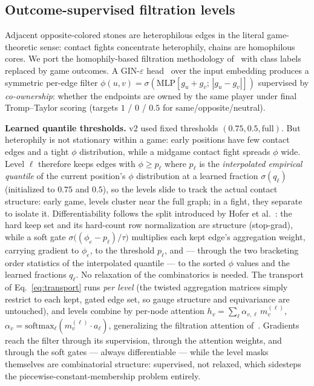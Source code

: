 \documentclass[11pt]{article}
\newcommand{\eps}{\varepsilon}
\begin{document}
\subsection{Outcome-supervised filtration levels}
\label{sec:filtration}
Adjacent opposite-colored stones are heterophilous edges in the literal
game-theoretic sense: contact fights concentrate heterophily, chains are
homophilous cores. We port the homophily-based filtration methodology
of~\cite{leventhal2025filtration} with class labels replaced by game
outcomes. A GIN-$\eps$ head~\cite{xu2019gin,hofer2020} over the input
embedding produces a symmetric per-edge filter
$\phi(u,v)=\sigma(\mathrm{MLP}[g_u{+}g_v;\,|g_u{-}g_v|])$ supervised by
\emph{co-ownership}: whether the endpoints are owned by the same player
under final Tromp--Taylor scoring (targets $1$ / $0$ / $0.5$ for
same/opposite/neutral).

\textbf{Learned quantile thresholds.} v2 used fixed thresholds
$(0.75, 0.5, \text{full})$. But heterophily is not stationary within a
game: early positions have few contact edges and a tight $\phi$
distribution, while a midgame contact fight spreads $\phi$ wide. Level
$\ell$ therefore keeps edges with $\phi \ge p_\ell$ where $p_\ell$ is the
\emph{interpolated empirical quantile} of the current position's $\phi$
distribution at a learned fraction $\sigma(q_\ell)$ (initialized to
$0.75$ and $0.5$), so the levels slide to track the actual contact
structure: early game, levels cluster near the full graph; in a fight,
they separate to isolate it. Differentiability follows the split
introduced by Hofer et al.~\cite{hofer2020}: the hard keep set and its
hard-count row normalization are structure (stop-grad), while a soft gate
$\sigma\!\big((\phi_e - p_\ell)/\tau\big)$ multiplies each kept edge's
aggregation weight, carrying gradient to $\phi_e$, to the threshold
$p_\ell$, and --- through the two bracketing order statistics of the
interpolated quantile --- to the sorted $\phi$ values and the learned
fractions $q_\ell$. No relaxation of the combinatorics is needed.
The transport of Eq.~\ref{eq:transport} runs \emph{per level}
(the twisted aggregation matrices simply restrict to each kept, gated
edge set, so gauge structure and equivariance are untouched), and levels
combine by per-node attention
$h_v = \sum_\ell \alpha_{v,\ell}\, m^{(\ell)}_v$,
$\alpha_{v}=\mathrm{softmax}_\ell(m^{(\ell)}_v \cdot a_\ell)$,
generalizing the filtration attention of~\cite{leventhal2025filtration}.
Gradients reach the filter through its supervision, through the
attention weights, and through the soft gates --- always differentiable
--- while the level masks themselves are combinatorial structure:
supervised, not relaxed, which
sidesteps the piecewise-constant-membership problem entirely.
\end{document}
